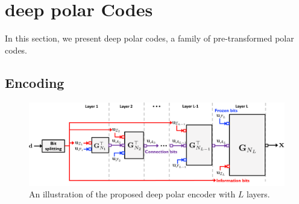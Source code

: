\documentclass[conference]{IEEEtran}
\begin{document}






  




\section{deep polar Codes}
In this section, we present deep polar codes, a family of pre-transformed polar codes.  
 
\subsection{Encoding}
\begin{figure}[t]
\centering
\includegraphics[width=1.7\columnwidth]{Encoder.pdf}
\caption{An illustration of the proposed deep polar encoder with $L$ layers.}
\label{fig:encoder}
\end{figure}
 
\end{document}
